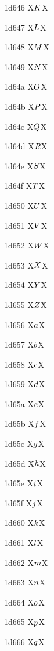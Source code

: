 \documentclass[11pt]{article}
\begin{document}
1d646 X{\ensuremath{\mathsfbfsl{K}}}X

1d647 X{\ensuremath{\mathsfbfsl{L}}}X

1d648 X{\ensuremath{\mathsfbfsl{M}}}X

1d649 X{\ensuremath{\mathsfbfsl{N}}}X

1d64a X{\ensuremath{\mathsfbfsl{O}}}X

1d64b X{\ensuremath{\mathsfbfsl{P}}}X

1d64c X{\ensuremath{\mathsfbfsl{Q}}}X

1d64d X{\ensuremath{\mathsfbfsl{R}}}X

1d64e X{\ensuremath{\mathsfbfsl{S}}}X

1d64f X{\ensuremath{\mathsfbfsl{T}}}X

1d650 X{\ensuremath{\mathsfbfsl{U}}}X

1d651 X{\ensuremath{\mathsfbfsl{V}}}X

1d652 X{\ensuremath{\mathsfbfsl{W}}}X

1d653 X{\ensuremath{\mathsfbfsl{X}}}X

1d654 X{\ensuremath{\mathsfbfsl{Y}}}X

1d655 X{\ensuremath{\mathsfbfsl{Z}}}X

1d656 X{\ensuremath{\mathsfbfsl{a}}}X

1d657 X{\ensuremath{\mathsfbfsl{b}}}X

1d658 X{\ensuremath{\mathsfbfsl{c}}}X

1d659 X{\ensuremath{\mathsfbfsl{d}}}X

1d65a X{\ensuremath{\mathsfbfsl{e}}}X

1d65b X{\ensuremath{\mathsfbfsl{f}}}X

1d65c X{\ensuremath{\mathsfbfsl{g}}}X

1d65d X{\ensuremath{\mathsfbfsl{h}}}X

1d65e X{\ensuremath{\mathsfbfsl{i}}}X

1d65f X{\ensuremath{\mathsfbfsl{j}}}X

1d660 X{\ensuremath{\mathsfbfsl{k}}}X

1d661 X{\ensuremath{\mathsfbfsl{l}}}X

1d662 X{\ensuremath{\mathsfbfsl{m}}}X

1d663 X{\ensuremath{\mathsfbfsl{n}}}X

1d664 X{\ensuremath{\mathsfbfsl{o}}}X

1d665 X{\ensuremath{\mathsfbfsl{p}}}X

1d666 X{\ensuremath{\mathsfbfsl{q}}}X
\end{document}
